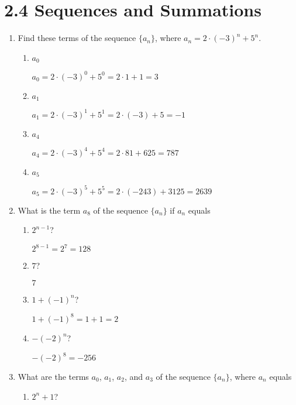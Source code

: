 \documentclass[11pt]{article}
\begin{document}
\section*{\textbf{2.4 Sequences and Summations}}
\begin{enumerate}[label=\textbf{\arabic*.}]
	\item Find these terms of the sequence $\{a_n\}$, where $a_n = 2 \cdot (-3)^n + 5^n$.
	
	\begin{enumerate}[label=\textbf{\alph*)}]
		\item $a_0$
		
		$a_0 = 2 \cdot (-3)^0 + 5^0 = 2 \cdot 1 + 1 = 3$
		
		\item $a_1$
		
		$a_1 = 2 \cdot (-3)^1 + 5^1 = 2 \cdot (-3) + 5 = -1$
		
		\item $a_4$
		
		$a_4 = 2 \cdot (-3)^4 + 5^4 = 2 \cdot 81 + 625 = 787$
		
		\item $a_5$
		
		$a_5 = 2 \cdot (-3)^5 + 5^5 = 2 \cdot (-243) + 3125 = 2639$
	\end{enumerate}

	\item What is the term $a_8$ of the sequence $\{a_n\}$ if $a_n$ equals
	
	\begin{enumerate}[label=\textbf{\alph*)}]
		\item $2^{n-1}$?
		
		$2^{8 - 1} = 2^7 = 128$
		
		\item $7$?
		
		$7$
		
		\item $1 + (-1)^n$?
		
		$1 + (-1)^8 = 1 + 1 = 2$
		
		\item $-(-2)^n$?
		
		$-(-2)^8 = -256$
	\end{enumerate}

	\item What are the terms $a_0$, $a_1$, $a_2$, and $a_3$ of the sequence $\{a_n\}$, where $a_n$ equals
	
	\begin{enumerate}[label=\textbf{\alph*)}]
		\item $2^n + 1$?
		

\end{enumerate}
\end{enumerate}
\end{document}
